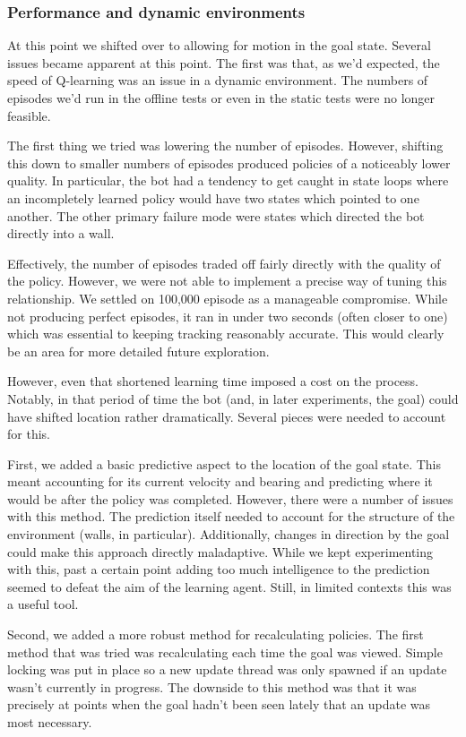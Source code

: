 \documentclass{aiaa-tc}%
\begin{document}
\subsubsection{Performance and dynamic environments}

At this point we shifted over to allowing for motion in the goal
state. Several issues became apparent at this point. The first was that, as we'd expected, the
speed of Q-learning was an issue in a dynamic environment. The numbers
of episodes we'd run in the offline tests or even in the
static tests were no
longer feasible. 

The first thing we tried was lowering the number of episodes. 
However, shifting this down to smaller numbers of episodes produced policies of a noticeably lower quality. In
particular, the bot had a tendency to get caught in state loops where
an incompletely learned policy would have two states which pointed to
one another. The other primary failure mode were states which directed
the bot directly into a wall.

Effectively, the number of episodes traded off fairly directly with
the quality of the policy. However, we were not able to implement a
precise way of tuning this relationship. We settled on 100,000 episode as a manageable
compromise. While not producing perfect episodes, it ran in under two
seconds (often closer to one) which was essential to
keeping tracking reasonably accurate. This would clearly be an area
for more detailed future exploration.

However, even that shortened learning time imposed a cost on the process. Notably, in
that period of time the bot (and, in later experiments, the goal)
could have shifted location rather dramatically. Several pieces were
needed to account for this.

First, we added a basic predictive aspect to the location of the goal
state. This meant accounting for its current velocity and bearing and
predicting where it would be after the policy was completed. However,
there were a number of issues with this method. The prediction itself
needed to account for the structure of the environment (walls, in
particular). Additionally, changes in direction by the goal could make
this approach directly maladaptive. While we kept experimenting with
this, past a certain point adding too much intelligence to the
prediction seemed to defeat the aim of the learning agent. Still, in
limited contexts this was a useful tool.

Second, we added a more robust method for recalculating policies. The
first method that was tried was recalculating each time the goal
was viewed. Simple locking was put in place so a new update thread was
only spawned if an update wasn't currently in progress. The downside
to this method was that it was precisely at points when the goal
hadn't been seen lately that an update was most necessary.
\end{document}
